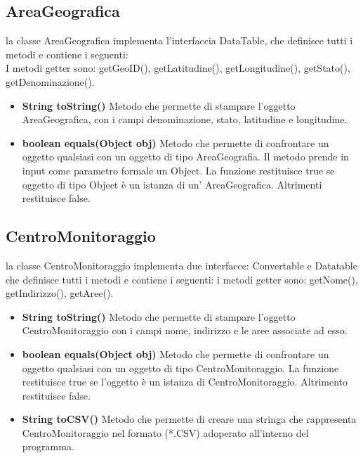 \documentclass[a4paper, 12pt]{report}
\begin{document}
			\subsection{AreaGeografica}
			la classe AreaGeografica implementa l'interfaccia DataTable, che definisce tutti i metodi e contiene i seguenti:\\
			I metodi getter sono: getGeoID(), getLatitudine(), getLongitudine(), getStato(), getDenominazione().
			\begin{itemize}
				\item \textbf{String toString()}
				Metodo che permette di stampare l'oggetto AreaGeografica, con i campi denominazione, stato, latitudine e longitudine.
				\item \textbf{boolean equals(Object obj)}
				Metodo che permette di confrontare un oggetto qualsiasi con un oggetto di tipo AreaGeografia. Il metodo prende in input come parametro formale un Object. La funzione restituisce true se oggetto di tipo Object è un istanza di un' AreaGeografica. Altrimenti restituisce false.
			\end{itemize}

			\subsection{CentroMonitoraggio}
			la classe CentroMonitoraggio implementa due interfacce: Convertable e Datatable che definisce tutti i metodi e contiene i seguenti:
			i metodi getter sono: getNome(), getIndirizzo(), getAree().
			\begin{itemize}
				\item \textbf{String toString()}
				Metodo che permette di stampare l'oggetto CentroMonitoraggio con i campi nome, indirizzo e le aree associate ad esso.
				\item \textbf{boolean equals(Object obj)}
				Metodo che permette di confrontare un oggetto qualsiasi con un oggetto di tipo CentroMonitoraggio. La funzione restituisce true se l'oggetto è un istanza di CentroMonitoraggio. Altrimento restituisce false.
				\item \textbf{String toCSV()}
				Metodo che permette di creare una stringa che rappresenta CentroMonitoraggio nel formato (*.CSV) adoperato all'interno del programma.
			\end{itemize}
\end{document}
